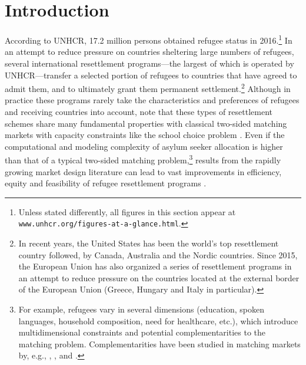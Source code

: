 \documentclass[12pt,fleqn]{article}
\begin{document}

\section{Introduction}
According to UNHCR, 17.2 million persons obtained refugee status in 2016.\footnote{Unless stated differently, all figures in this section appear at \texttt{www.unhcr.org/figures-at-a-glance.html}.} In an attempt to reduce pressure on countries sheltering large numbers of refugees, several international resettlement programs---the largest of which is operated by UNHCR---transfer a selected portion of refugees to countries that have agreed to admit them, and to ultimately grant them permanent settlement.\footnote{In recent years, the United States has been the world's top resettlement country followed, by Canada, Australia and the Nordic countries. Since 2015, the European Union has also organized a series of resettlement programs in an attempt to reduce pressure on the countries located at the external border of the European Union (Greece, Hungary and Italy in particular).} Although in practice these programs rarely take the characteristics and preferences of refugees and receiving countries into account, \citet{bib:JonesTeytelboym2016b,bib:JonesTeytelboym2016a} note that these types of resettlement schemes share many fundamental properties with classical two-sided matching markets with capacity constraints like the school choice problem \citep{bib:AbdulkadirougluSonmez}. Even if the computational and modeling complexity of asylum seeker allocation is higher than that of a typical two-sided matching problem,\footnote{For example, refugees vary in several dimensions (education, spoken languages, household composition, need for healthcare, etc.), which introduce multidimensional constraints and potential complementarities to the matching problem. Complementarities have been studied in matching markets by, e.g., \citet{bib:HatfieldKominers}, \citet{bib:PathakRoth}, \citet{bib:Pycia} and \citet{bib:RothPeranson}.} results from the rapidly growing market design literature can lead to vast improvements in efficiency, equity and feasibility of refugee resettlement programs \citep{bib:Andersson,bib:BansakEtAl,bib:DelacretazEtAl2016,bib:JonesTeytelboym2016b, bib:JonesTeytelboym2016a}.
\end{document}
